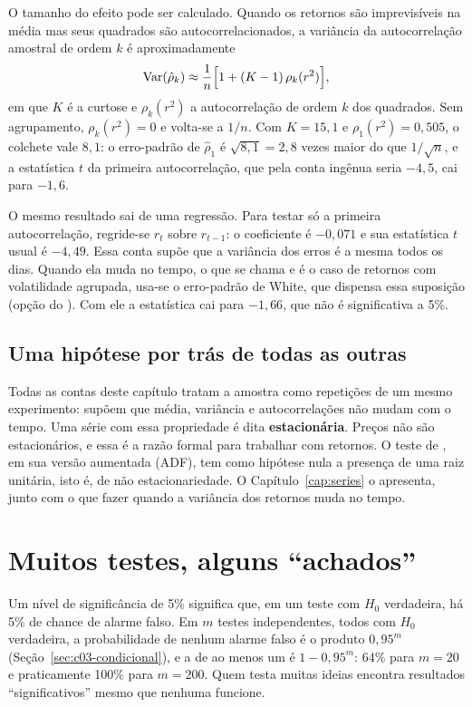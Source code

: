 O tamanho do efeito pode ser calculado. Quando os retornos são imprevisíveis na média mas seus quadrados são autocorrelacionados, a variância da autocorrelação amostral de ordem $k$ é aproximadamente
\begin{equation}
  \operatorname{Var}(\hat\rho_k) \approx \frac{1}{n}\Big[1 + (K-1)\,\rho_k(r^2)\Big] ,
  \label{eq:c04-var-acf}
\end{equation}
em que $K$ é a curtose e $\rho_k(r^2)$ a autocorrelação de ordem $k$ dos quadrados. Sem agrupamento, $\rho_k(r^2) = 0$ e volta-se a $1/n$. Com $K = 15,1$ e $\rho_1(r^2) = 0,505$, o colchete vale $8,1$: o erro-padrão de $\hat\rho_1$ é $\sqrt{8,1} = 2,8$ vezes maior do que $1/\sqrt{n}$, e a estatística $t$ da primeira autocorrelação, que pela conta ingênua seria $-4,5$, cai para $-1,6$.

O mesmo resultado sai de uma regressão. Para testar só a primeira autocorrelação, regride-se $r_t$ sobre $r_{t-1}$: o coeficiente é $-0,071$ e sua estatística $t$ usual é $-4,49$. Essa conta supõe que a variância dos erros é a mesma todos os dias. Quando ela muda no tempo, o que se chama  e é o caso de retornos com volatilidade agrupada, usa-se o erro-padrão de White, que dispensa essa suposição (opção  do ). Com ele a estatística cai para $-1,66$, que não é significativa a 5\%.

\subsection{Uma hipótese por trás de todas as outras}

Todas as contas deste capítulo tratam a amostra como repetições de um mesmo experimento: supõem que média, variância e autocorrelações não mudam com o tempo. Uma série com essa propriedade é dita \textbf{estacionária}. Preços não são estacionários, e essa é a razão formal para trabalhar com retornos. O teste de \citet{dickey1979}, em sua versão aumentada (ADF), tem como hipótese nula a presença de uma raiz unitária, isto é, de não estacionariedade. O Capítulo~\ref{cap:series} o apresenta, junto com o que fazer quando a variância dos retornos muda no tempo.

\section{Muitos testes, alguns ``achados''}
\label{sec:c04-multiplos}

Um nível de significância de 5\% significa que, em um teste com $H_0$ verdadeira, há 5\% de chance de alarme falso. Em $m$ testes independentes, todos com $H_0$ verdadeira, a probabilidade de nenhum alarme falso é o produto $0,95^m$ (Seção~\ref{sec:c03-condicional}), e a de ao menos um é $1 - 0,95^m$: 64\% para $m = 20$ e praticamente 100\% para $m = 200$. Quem testa muitas ideias encontra resultados ``significativos'' mesmo que nenhuma funcione.

